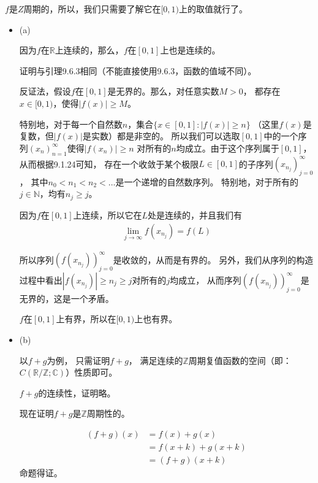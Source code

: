 \documentclass{article}
\begin{document}
$f$是$Z$周期的，所以，我们只需要了解它在$[0, 1)$上的取值就行了。

\begin{itemize}
  \item (a)


        因为$f$在$\mathbb{R}$上连续的，那么，$f$在$[0, 1]$上也是连续的。

        证明与引理9.6.3相同（不能直接使用9.6.3，函数的值域不同）。

        反证法，假设$f$在$[0, 1]$是无界的。那么，对任意实数$M > 0$，
        都存在$x \in [0, 1)$，使得$|f(x)| \geq M$。

        特别地，对于每一个自然数$n$，集合$\{x \in [0, 1]: |f(x)| \geq n\}$
        （这里$f(x)$是复数，但$|f(x)|$是实数）都是非空的。
        所以我们可以选取$[0, 1]$中的一个序列$(x_n)_{n=1}^\infty$使得$|f(x_n)| \geq n$
        对所有的$n$均成立。由于这个序列属于$[0, 1]$，从而根据9.1.24可知，
        存在一个收敛于某个极限$L \in [0, 1]$的子序列$(x_{n_j})_{j = 0}^\infty$，
        其中$n_0 < n_1 < n_2 < \dots$是一个递增的自然数序列。
        特别地，对于所有的$j \in \mathbb{N}$，均有$n_j \geq j$。

        因为$f$在$[0, 1]$上连续，所以它在$L$处是连续的，并且我们有
        \begin{align}
          \lim_{j \to \infty} f(x_{n_j}) = f(L)
        \end{align}

        所以序列$(f(x_{n_j}))_{j = 0}^\infty$是收敛的，从而是有界的。
        另外，我们从序列的构造过程中看出$|f(x_{n_j})| \geq n_j \geq j$对所有的$j$均成立，
        从而序列$(f(x_{n_j}))_{j = 0}^\infty$是无界的，这是一个矛盾。

        $f$在$[0, 1]$上有界，所以在$[0, 1)$上也有界。

  \item (b)

        以$f + g$为例， 只需证明$f + g$，
        满足连续的$\mathbb{Z}$周期复值函数的空间（即：$C(\mathbb{R}/\mathbb{Z}; \mathbb{C})$）性质即可。

        $f + g$的连续性，证明略。

        现在证明$f + g$是$\mathbb{Z}$周期性的。

        \begin{align*}
          (f + g)(x) & = f(x) + g(x)         \\
                     & = f(x + k) + g(x + k) \\
                     & = (f + g)(x + k)
        \end{align*}
        命题得证。


\end{itemize}
\end{document}
